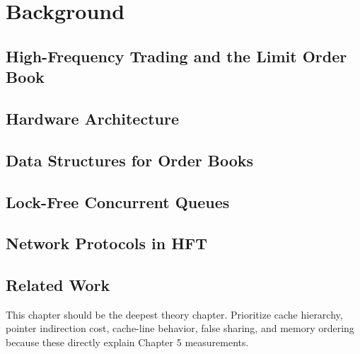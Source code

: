 \chapter{Background}

\section{High-Frequency Trading and the Limit Order Book}
\section{Hardware Architecture}
\section{Data Structures for Order Books}
\section{Lock-Free Concurrent Queues}
\section{Network Protocols in HFT}
\section{Related Work}

This chapter should be the deepest theory chapter. Prioritize cache hierarchy, pointer indirection cost, cache-line behavior, false sharing, and memory ordering because these directly explain Chapter 5 measurements.
